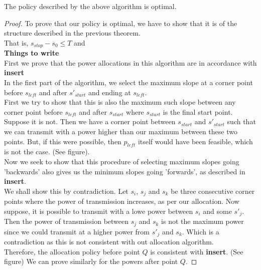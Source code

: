 \begin{theorem}
The policy described by the above algorithm is optimal.
\end{theorem}
\begin{proof}
To prove that our policy is optimal, we have to show that it is of the structure described in the previous theorem. \\
That is, $s_{stop} - s_0 \leq T$ and \\
\textbf{Things to write}\\
First we prove that the power allocations in this algorithm are in accordance with \textbf{insert}\\
In the first part of the algorithm, we select the maximum slope at a corner point before $s_{left}$ and after $s'_{start}$ and ending at $s_{left}$. \\
First we try to show that this is also the maximum such slope between any corner point before $s_{left}$ and after $s_{start}$ where $s_{start}$ is the final start point. \\
Suppose it is not. Then we have a corner point between $s_{start}$ and $s'_{start}$ such that we can transmit with a power higher than our maximum between these two points. But, if this were possible, then 
$p_{left}$ itself would have been feasible, which is not the case. (See figure).\\
Now we seek to show that this procedure of selecting maximum slopes going 'backwards' also gives us the minimum slopes going 'forwards', as described in \textbf{insert}.\\
We shall show this by contradiction. Let $s_i$, $s_j$ and $s_k$ be three consecutive corner points where the power of transmission increases, as per our allocation. Now suppose, it is possible to transmit with a lowe power between $s_i$ and some $s'_j$. 
Then the power of transmission between $s_j$ and $s_k$ is not the maximum power since we could transmit at a higher power from $s'_j$ and $s_k$. Which is a contradiction as this is not consistent with out allocation algorithm.\\
Therefore, the allocation policy before point $Q$ is consistent with \textbf{insert}. (See figure)
We can prove similarly for the powers after point $Q$.
\end{proof}




